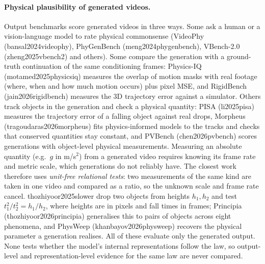 \documentclass[10pt]{article}
\providecommand{\citet}[1]{\textsf{#1}}
\providecommand{\citep}[1]{(\textsf{#1})}
\begin{document}
\paragraph{Physical plausibility of generated videos.}
Output benchmarks score generated videos in three ways. Some ask a human or a vision-language model to rate physical
commonsense (VideoPhy \citep{bansal2024videophy}, PhyGenBench \citep{meng2024phygenbench}, VBench-2.0
\citep{zheng2025vbench2} and others). Some compare the generation with a ground-truth
continuation of the same conditioning frames: Physics-IQ \citep{motamed2025physicsiq} measures the overlap of motion
masks with real footage (where, when and how much motion occurs) plus pixel MSE, and RigidBench
\citep{jain2026rigidbench} measures the 3D trajectory error against a simulator. Others track objects in the generation
and check a physical quantity: PISA \citep{li2025pisa} measures the trajectory error of a falling object against real
drops, Morpheus \citep{tragoudaras2026morpheus} fits physics-informed models to the tracks and checks that conserved
quantities stay constant, and PVBench \citep{chen2026pvbench} scores generations with object-level physical measurements.
Measuring an absolute quantity (e.g.\ $g$ in m/s$^2$) from a generated video requires knowing its frame rate and
metric scale, which generations do not reliably have. The closest work therefore uses \emph{unit-free relational
tests}: two measurements of the same kind are taken in one video and compared as a ratio, so the unknown scale and
frame rate cancel. \citet{thozhiyoor2025slower} drop two objects from heights $h_1,h_2$ and test
$t_1^2/t_2^2=h_1/h_2$, where heights are in pixels and fall times in frames; Principia \citep{thozhiyoor2026principia}
generalises this to pairs of objects across eight phenomena, and PhysWeep \citep{khanbayov2026physweep} recovers the
physical parameter a generation realises. All of these evaluate only the generated output. None tests whether the
model's internal representations follow the law, so output-level and representation-level evidence for the same law
are never compared.
\end{document}
